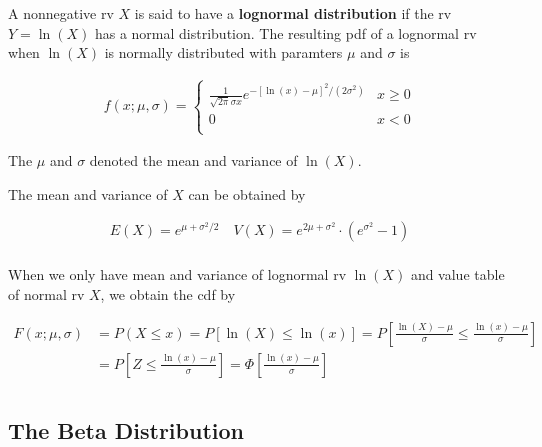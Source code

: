 \begin{definition}
    A nonnegative rv $X$ is said to have a \textbf{lognormal distribution} if the rv $Y=\ln (X)$ has a normal distribution. The resulting pdf of a lognormal rv when $\ln (X)$ is normally distributed with paramters $\mu$ and $\sigma$ is 
    
    \begin{align*}
        f(x;\mu,\sigma) = \left\{\begin{array}{cl}
            \frac{1}{\sqrt{2\pi}\sigma x} e^{-[\ln(x) - \mu]^2/(2\sigma^2)} & x\geq 0\\
            0 & x<0\\
        \end{array}\right.
    \end{align*}
    
    The $\mu$ and $\sigma$ denoted the mean and variance of $\ln(X)$.
    
    The mean and variance of $X$ can be obtained by
    
    \begin{align*}
        E(X) = e^{\mu + \sigma^2/2}\quad V(X) = e^{2\mu + \sigma^2}\cdot (e^{\sigma^2} - 1) \\
    \end{align*}

    When we only have mean and variance of lognormal rv $\ln(X)$ and value table of normal rv $X$, we obtain the cdf by

    \begin{align*}
        F(x;\mu,\sigma) & = P(X\leq x) = P[\ln (X)\leq \ln (x)] = P\left[\frac{\ln(X)-\mu}{\sigma}\leq\frac{\ln(x)-\mu}{\sigma}\right] \\
        & = P\left[Z\leq \frac{\ln(x)-\mu}{\sigma}\right] = \Phi\left[\frac{\ln(x)-\mu}{\sigma}\right] \\
    \end{align*}
\end{definition}

\subsection{The Beta Distribution}

